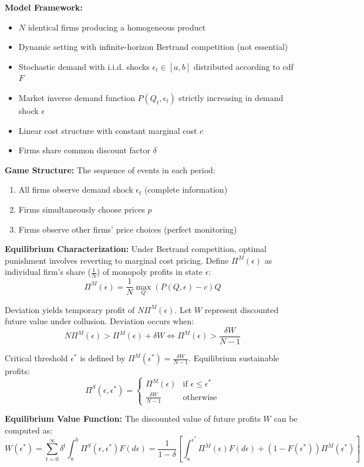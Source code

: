 \documentclass[11pt]{elegantbook_2}
\begin{document}
\textbf{Model Framework:}
\begin{itemize}
    \item $N$ identical firms producing a homogeneous product
    \item Dynamic setting with infinite-horizon Bertrand competition (not essential)
    \item Stochastic demand with i.i.d. shocks $\epsilon_t \in [a,b]$ distributed according to cdf $F$
    \item Market inverse demand function $P(Q_t,\epsilon_t)$ strictly increasing in demand shock $\epsilon$
    \item Linear cost structure with constant marginal cost $c$
    \item Firms share common discount factor $\delta$
\end{itemize}

\textbf{Game Structure:}
The sequence of events in each period:
\begin{enumerate}
    \item All firms observe demand shock $\epsilon_t$ (complete information)
    \item Firms simultaneously choose prices $p$
    \item Firms observe other firms' price choices (perfect monitoring)
\end{enumerate}

\textbf{Equilibrium Characterization:}
Under Bertrand competition, optimal punishment involves reverting to marginal cost pricing. Define $\Pi^M(\epsilon)$ as individual firm's share ($\frac{1}{N}$) of monopoly profits in state $\epsilon$:
\[\Pi^M(\epsilon) = \frac{1}{N}\max_Q(P(Q,\epsilon)-c)Q\]

Deviation yields temporary profit of $N\Pi^M(\epsilon)$. Let $W$ represent discounted future value under collusion. Deviation occurs when:
\[N\Pi^M(\epsilon) > \Pi^M(\epsilon) + \delta W \Leftrightarrow \Pi^M(\epsilon) > \frac{\delta W}{N-1}\]

Critical threshold $\epsilon^*$ is defined by $\Pi^M(\epsilon^*) = \frac{\delta W}{N-1}$. Equilibrium sustainable profits:
\[\Pi^S(\epsilon,\epsilon^*) = \begin{cases}
    \Pi^M(\epsilon) & \text{if } \epsilon \leq \epsilon^* \\
    \frac{\delta W}{N-1} & \text{otherwise}
\end{cases}\]

\textbf{Equilibrium Value Function:}
The discounted value of future profits $W$ can be computed as:
\[W(\epsilon^*) = \sum_{t=0}^{\infty} \delta^t \int_a^b \Pi^S(\epsilon,\epsilon^*)F(d\epsilon) = \frac{1}{1-\delta}\left[\int_a^{\epsilon^*} \Pi^M(\epsilon)F(d\epsilon) + (1-F(\epsilon^*))\Pi^M(\epsilon^*)\right]\]
\end{document}
